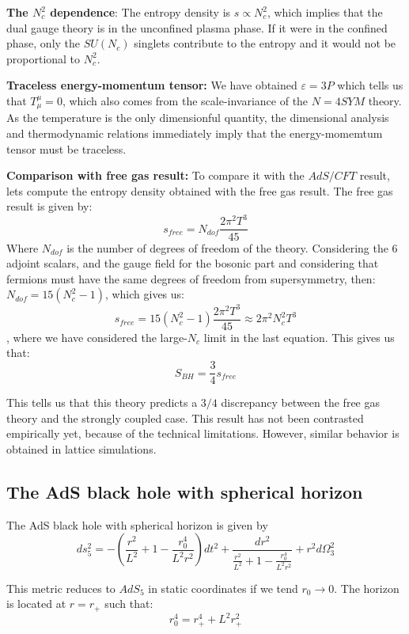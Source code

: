 \documentclass[12pt]{article}
\begin{document}
\textbf{The $N_c^2$ dependence}: The entropy density is $s\propto N_c^2$, which implies that the dual gauge theory is in the unconfined plasma phase. If it were in the confined phase, only the $SU(N_c)$ singlets contribute to the entropy and it would not be proportional to $N_c^2$.

\vspace{.25cm}

\textbf{Traceless energy-momentum tensor:} We have obtained $\varepsilon=3P$ which tells us that $T^\mu_\mu = 0$, which also comes from the scale-invariance of the $N=4 SYM$ theory. As the temperature is the only dimensionful quantity, the dimensional analysis and thermodynamic relations immediately imply that the energy-momemtum tensor must be traceless.

\textbf{Comparison with free gas result:} To compare it with the $AdS/CFT$ result, lets compute the entropy density obtained with the free gas result. The free gas result is given by:
\[
    s_{free} = N_{dof}\frac{2\pi^2 T^3}{45}
\]
Where $N_{dof}$ is the number of degrees of freedom of the theory. Considering the 6 adjoint scalars, and the gauge field for the bosonic part and considering that fermions must have the same degrees of freedom from supersymmetry, then: $N_{dof} = 15(N_c^2-1)$, which gives us:
\[
    s_{free}= 15(N_c^2-1) \frac{2\pi^2 T^3}{45} \approx 2\pi^2N_c^2 T^3
\]
, where we have considered the large-$N_c$ limit in the last equation. This gives us that:
\[
    S_{BH} = \frac{3}{4} s_{free}
\]

This tells us that this theory predicts a $3/4$ discrepancy between the free gas theory and the strongly coupled case. This result has not been contrasted empirically yet, because of the technical limitations. However, similar behavior is obtained in lattice simulations.

\subsection{The AdS black hole with spherical horizon}

The AdS black hole with spherical horizon is given by
\[
    ds_5^2 = -\left(\frac{r^2}{L^2}+1-\frac{r_0^4}{L^2r^2}\right)dt^2+\frac{dr^2}{\frac{r^2}{L^2}+1-\frac{r_0^4}{L^2r^2}}+r^2 d\Omega_3^2
\]

This metric reduces to $AdS_5$ in static coordinates if we tend $r_0\longrightarrow 0$. The horizon is located at $r=r_+$ such that:
\[
    r_0^4 = r_+^4 + L^2r_+^2
\]
\end{document}
